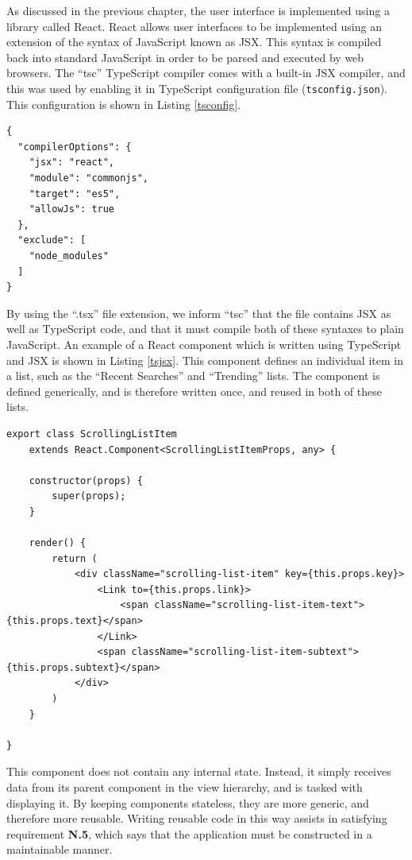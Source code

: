 \documentclass{l4proj}
\newcommand{\code}[1]{\texttt{#1}}
\begin{document}
    As discussed in the previous chapter, the user interface is implemented using a library called React. React allows user interfaces to be implemented using an extension of the syntax of JavaScript known as JSX. This syntax is compiled back into standard JavaScript in order to be parsed and executed by web browsers. The ``tsc'' TypeScript compiler comes with a built-in JSX compiler, and this was used by enabling it in TypeScript configuration file (\code{tsconfig.json}). This configuration is shown in Listing \ref{tsconfig}.
    
\begin{lstlisting}[label=tsconfig,caption=TypeScript compiler configuration.]
{
  "compilerOptions": {
    "jsx": "react",
    "module": "commonjs",
    "target": "es5",
    "allowJs": true
  },
  "exclude": [
    "node_modules"
  ]
}
\end{lstlisting}

By using the ``.tsx'' file extension, we inform ``tsc'' that the file contains JSX as well as TypeScript code, and that it must compile both of these syntaxes to plain JavaScript. An example of a React component which is written using TypeScript and JSX is shown in Listing \ref{tsjsx}. This component defines an individual item in a list, such as the ``Recent Searches'' and ``Trending'' lists. The component is defined generically, and is therefore written once, and reused in both of these lists.

\begin{lstlisting}[caption={Definition of a reusable list-item component using React, JSX, and TypeScript},label=tsjsx]
export class ScrollingListItem 
    extends React.Component<ScrollingListItemProps, any> {

    constructor(props) {
        super(props);
    }

    render() {
        return (
            <div className="scrolling-list-item" key={this.props.key}>
                <Link to={this.props.link}>
                    <span className="scrolling-list-item-text">{this.props.text}</span>
                </Link>
                <span className="scrolling-list-item-subtext">{this.props.subtext}</span>
            </div>
        )
    }

}
\end{lstlisting}

This component does not contain any internal state. Instead, it simply receives data from its parent component in the view hierarchy, and is tasked with displaying it. By keeping components stateless, they are more generic, and therefore more reusable. Writing reusable code in this way assists in satisfying requirement \textbf{N.5}, which says that the application must be constructed in a maintainable manner.
\end{document}

